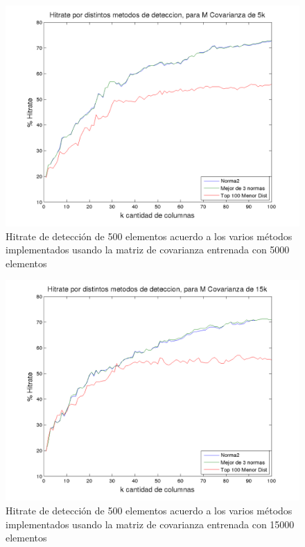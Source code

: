 \begin{figure}[H]
\begin {center}
\includegraphics[width=\hrwidth]{plots/hitrate-5kcv.png}
\end {center}
\caption{Hitrate de detecci\'on de 500 elementos acuerdo a los varios m\'etodos implementados
usando la matriz de covarianza entrenada con 5000 elementos}
\label{fig:HR5kcv}
\end{figure}

\begin{figure}[H]
\begin {center}
\includegraphics[width=\hrwidth]{plots/hitrate-15kcv.png}
\end {center}
\caption{Hitrate de detecci\'on de 500 elementos acuerdo a los varios m\'etodos implementados
usando la matriz de covarianza entrenada con 15000 elementos}
\label{fig:HR15kcv}
\end{figure}

